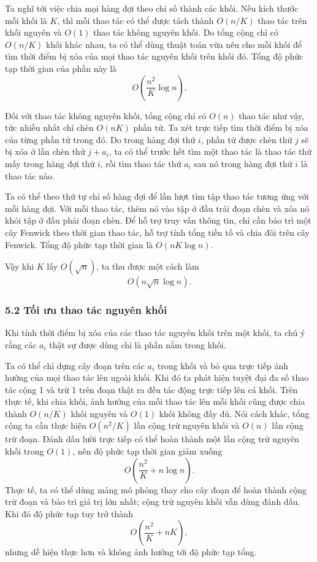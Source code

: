 \documentclass[11pt]{article}
\begin{document}
Ta nghĩ tới việc chia mọi hàng đợi theo chỉ số thành các khối. Nếu kích thước
mỗi khối là \(K\), thì mỗi thao tác có thể được tách thành \(O(n/K)\) thao tác
trên khối nguyên và \(O(1)\) thao tác không nguyên khối. Do tổng cộng chỉ có
\(O(n/K)\) khối khác nhau, ta có thể dùng thuật toán vừa nêu cho mỗi khối để
tìm thời điểm bị xóa của mọi thao tác nguyên khối trên khối đó. Tổng độ phức tạp
thời gian của phần này là
\[
  O\left(\frac{n^2}{K}\log n\right).
\]

Đối với thao tác không nguyên khối, tổng cộng chỉ có \(O(n)\) thao tác như vậy,
tức nhiều nhất chỉ chèn \(O(nK)\) phần tử. Ta xét trực tiếp tìm thời điểm bị xóa
của từng phần tử trong đó. Do trong hàng đợi thứ \(i\), phần tử được chèn thứ
\(j\) sẽ bị xóa ở lần chèn thứ \(j+a_i\), ta có thể trước hết tìm một thao tác
là thao tác thứ mấy trong hàng đợi thứ \(i\), rồi tìm thao tác thứ \(a_i\) sau
nó trong hàng đợi thứ \(i\) là thao tác nào.

Ta có thể theo thứ tự chỉ số hàng đợi để lần lượt tìm tập thao tác tương ứng với
mỗi hàng đợi. Với mỗi thao tác, thêm nó vào tập ở đầu trái đoạn chèn và xóa nó
khỏi tập ở đầu phải đoạn chèn. Để hỗ trợ truy vấn thông tin, chỉ cần bảo trì một
cây Fenwick theo thời gian thao tác, hỗ trợ tính tổng tiền tố và chia đôi trên
cây Fenwick. Tổng độ phức tạp thời gian là \(O(nK\log n)\).

Vậy khi \(K\) lấy \(O(\sqrt n)\), ta thu được một cách làm
\[
  O(n\sqrt n\log n).
\]

\subsubsection*{5.2 Tối ưu thao tác nguyên khối}

Khi tính thời điểm bị xóa của các thao tác nguyên khối trên một khối, ta chú ý
rằng các \(a_i\) thật sự được dùng chỉ là phần nằm trong khối.

Ta có thể chỉ dựng cây đoạn trên các \(a_i\) trong khối và bỏ qua trực tiếp ảnh
hưởng của mọi thao tác lên ngoài khối. Khi đó ta phát hiện tuyệt đại đa số thao
tác cộng 1 và trừ 1 trên đoạn thật ra đều tác động trực tiếp lên cả khối. Trên
thực tế, khi chia khối, ảnh hưởng của mỗi thao tác lên mỗi khối cũng được chia
thành \(O(n/K)\) khối nguyên và \(O(1)\) khối không đầy đủ. Nói cách khác, tổng
cộng ta cần thực hiện \(O(n^2/K)\) lần cộng trừ nguyên khối và \(O(n)\) lần cộng
trừ đoạn. Đánh dấu lười trực tiếp có thể hoàn thành một lần cộng trừ nguyên khối
trong \(O(1)\), nên độ phức tạp thời gian giảm xuống
\[
  O\left(\frac{n^2}{K}+n\log n\right).
\]
Thực tế, ta có thể dùng mảng mô phỏng thay cho cây đoạn để hoàn thành cộng trừ
đoạn và bảo trì giá trị lớn nhất; cộng trừ nguyên khối vẫn dùng đánh dấu. Khi đó
độ phức tạp tuy trở thành
\[
  O\left(\frac{n^2}{K}+nK\right),
\]
nhưng dễ hiện thực hơn và không ảnh hưởng tới độ phức tạp tổng.
\end{document}
